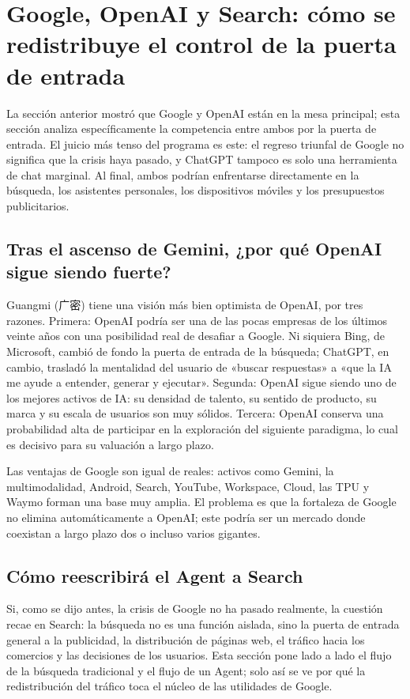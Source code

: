 \section{Google, OpenAI y Search: cómo se redistribuye el control de la puerta de entrada}

La sección anterior mostró que Google y OpenAI están en la mesa principal; esta sección analiza específicamente la competencia entre ambos por la puerta de entrada. El juicio más tenso del programa es este: el regreso triunfal de Google no significa que la crisis haya pasado, y ChatGPT tampoco es solo una herramienta de chat marginal. Al final, ambos podrían enfrentarse directamente en la búsqueda, los asistentes personales, los dispositivos móviles y los presupuestos publicitarios.

\subsection{Tras el ascenso de Gemini, ¿por qué OpenAI sigue siendo fuerte?}

Guangmi (广密) tiene una visión más bien optimista de OpenAI, por tres razones. Primera: OpenAI podría ser una de las pocas empresas de los últimos veinte años con una posibilidad real de desafiar a Google. Ni siquiera Bing, de Microsoft, cambió de fondo la puerta de entrada de la búsqueda; ChatGPT, en cambio, trasladó la mentalidad del usuario de «buscar respuestas» a «que la IA me ayude a entender, generar y ejecutar». Segunda: OpenAI sigue siendo uno de los mejores activos de IA: su densidad de talento, su sentido de producto, su marca y su escala de usuarios son muy sólidos. Tercera: OpenAI conserva una probabilidad alta de participar en la exploración del siguiente paradigma, lo cual es decisivo para su valuación a largo plazo.

Las ventajas de Google son igual de reales: activos como Gemini, la multimodalidad, Android, Search, YouTube, Workspace, Cloud, las TPU y Waymo forman una base muy amplia. El problema es que la fortaleza de Google no elimina automáticamente a OpenAI; este podría ser un mercado donde coexistan a largo plazo dos o incluso varios gigantes.

\subsection{Cómo reescribirá el Agent a Search}

Si, como se dijo antes, la crisis de Google no ha pasado realmente, la cuestión recae en Search: la búsqueda no es una función aislada, sino la puerta de entrada general a la publicidad, la distribución de páginas web, el tráfico hacia los comercios y las decisiones de los usuarios. Esta sección pone lado a lado el flujo de la búsqueda tradicional y el flujo de un Agent; solo así se ve por qué la redistribución del tráfico toca el núcleo de las utilidades de Google.

